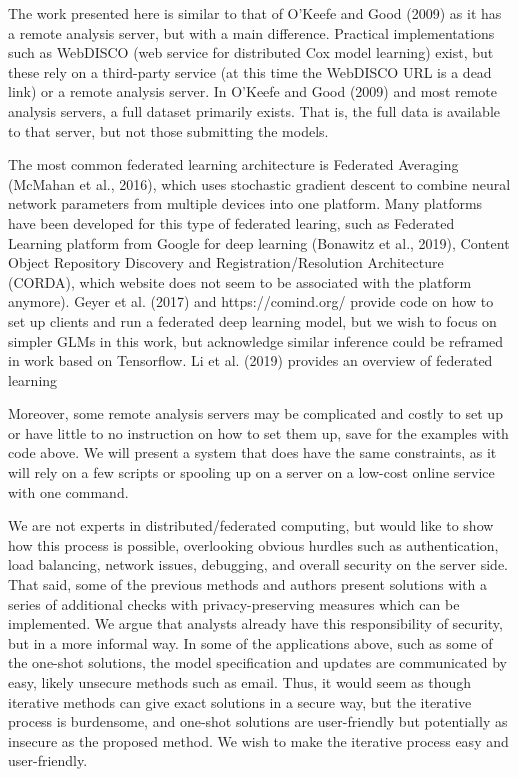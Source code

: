 \documentclass[]{elsarticle} %
\begin{document}
The work presented here is similar to that of O'Keefe and Good (2009) as
it has a remote analysis server, but with a main difference. Practical
implementations such as WebDISCO (web service for distributed Cox model
learning) exist, but these rely on a third-party service (at this time
the WebDISCO URL is a dead link) or a remote analysis server. In O'Keefe
and Good (2009) and most remote analysis servers, a full dataset
primarily exists. That is, the full data is available to that server,
but not those submitting the models.

The most common federated learning architecture is Federated Averaging
(McMahan et al., 2016), which uses stochastic gradient descent to
combine neural network parameters from multiple devices into one
platform. Many platforms have been developed for this type of federated
learing, such as Federated Learning platform from Google for deep
learning (Bonawitz et al., 2019), Content Object Repository Discovery
and Registration/Resolution Architecture (CORDA), which website does not
seem to be associated with the platform anymore). Geyer et al. (2017)
and https://comind.org/ provide code on how to set up clients and run a
federated deep learning model, but we wish to focus on simpler GLMs in
this work, but acknowledge similar inference could be reframed in work
based on Tensorflow. Li et al. (2019) provides an overview of federated
learning

Moreover, some remote analysis servers may be complicated and costly to
set up or have little to no instruction on how to set them up, save for
the examples with code above. We will present a system that does have
the same constraints, as it will rely on a few scripts or spooling up on
a server on a low-cost online service with one command.

We are not experts in distributed/federated computing, but would like to
show how this process is possible, overlooking obvious hurdles such as
authentication, load balancing, network issues, debugging, and overall
security on the server side. That said, some of the previous methods and
authors present solutions with a series of additional checks with
privacy-preserving measures which can be implemented. We argue that
analysts already have this responsibility of security, but in a more
informal way. In some of the applications above, such as some of the
one-shot solutions, the model specification and updates are communicated
by easy, likely unsecure methods such as email. Thus, it would seem as
though iterative methods can give exact solutions in a secure way, but
the iterative process is burdensome, and one-shot solutions are
user-friendly but potentially as insecure as the proposed method. We
wish to make the iterative process easy and user-friendly.
\end{document}
